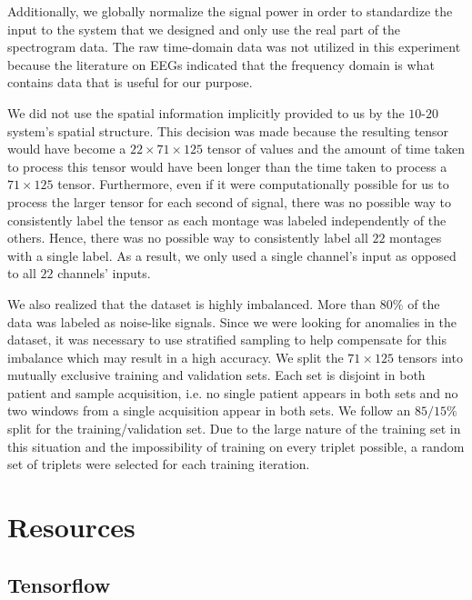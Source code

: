 Additionally, we globally normalize the signal power in order to standardize the input to the system that we designed and only use the real part of the spectrogram data. The raw time-domain data was not utilized in this experiment because the literature \cite{eegs_info, eeg_info2, mayo_eegs} on EEGs indicated that the frequency domain is what contains data that is useful for our purpose.


We did not use the spatial information implicitly provided to us by the $10$-$20$ system's spatial structure. This decision was made because the resulting tensor would have become a $22 \times 71 \times 125$ tensor of values and the amount of time taken to process this tensor would have been longer than the time taken to process a $71 \times 125$ tensor. Furthermore, even if it were computationally possible for us to process the larger tensor for each second of signal, there was no possible way to consistently label the tensor as each montage was labeled independently of the others. Hence, there was no possible way to consistently label all $22$ montages with a single label. As a result, we only used a single channel's input as opposed to all $22$ channels' inputs. 

We also realized that the dataset is highly imbalanced. More than $80\%$ of the data was labeled as noise-like signals. Since we were looking for anomalies in the dataset, it was necessary to use stratified sampling to help compensate for this imbalance which may result in a high accuracy. We split the $71 \times 125$ tensors into mutually exclusive training and validation sets. Each set is disjoint in both patient and sample acquisition, i.e. no single patient appears in both sets and no two windows from a single acquisition appear in both sets. We follow an $85/15\%$ split for the training/validation set. Due to the large nature of the training set in this situation and the impossibility of training on every triplet possible, a random set of triplets were selected for each training iteration. 

\section{Resources}


\subsection*{Tensorflow}

